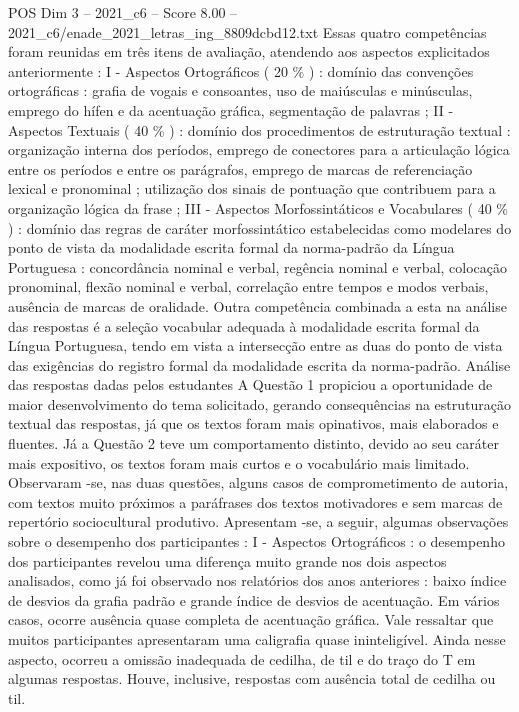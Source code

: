 \begin{textsample}{POS Dim 3 – 2021\_c6 – Score 8.00 – 2021\_c6/enade\_2021\_letras\_ing\_8809dcbd12.txt}
Essas quatro competências foram reunidas em três itens de avaliação, atendendo aos aspectos explicitados anteriormente : I - Aspectos Ortográficos ( 20 \% ) : domínio das convenções ortográficas : grafia de vogais e consoantes, uso de maiúsculas e minúsculas, emprego do hífen e da acentuação gráfica, segmentação de palavras ; II - Aspectos Textuais ( 40 \% ) : domínio dos procedimentos de estruturação textual : organização interna dos períodos, emprego de conectores para a articulação lógica entre os períodos e entre os parágrafos, emprego de marcas de referenciação lexical e pronominal ; utilização dos sinais de pontuação que contribuem para a organização lógica da frase ; III - Aspectos Morfossintáticos e Vocabulares ( 40 \% ) : domínio das regras de caráter morfossintático estabelecidas como modelares do ponto de vista da modalidade escrita formal da norma-padrão da Língua Portuguesa : concordância nominal e verbal, regência nominal e verbal, colocação pronominal, flexão nominal e verbal, correlação entre tempos e modos verbais, ausência de marcas de oralidade.
Outra competência combinada a esta na análise das respostas é a seleção vocabular adequada à modalidade escrita formal da Língua Portuguesa, tendo em vista a intersecção entre as duas do ponto de vista das exigências do registro formal da modalidade escrita da norma-padrão.
Análise das respostas dadas pelos estudantes A Questão 1 propiciou a oportunidade de maior desenvolvimento do tema solicitado, gerando consequências na estruturação textual das respostas, já que os textos foram mais opinativos, mais elaborados e fluentes.
Já a Questão 2 teve um comportamento distinto, devido ao seu caráter mais expositivo, os textos foram mais curtos e o vocabulário mais limitado.
Observaram -se, nas duas questões, alguns casos de comprometimento de autoria, com textos muito próximos a paráfrases dos textos motivadores e sem marcas de repertório sociocultural produtivo.
Apresentam -se, a seguir, algumas observações sobre o desempenho dos participantes : I - Aspectos Ortográficos : o desempenho dos participantes revelou uma diferença muito grande nos dois aspectos analisados, como já foi observado nos relatórios dos anos anteriores : baixo índice de desvios da grafia padrão e grande índice de desvios de acentuação.
Em vários casos, ocorre ausência quase completa de acentuação gráfica.
Vale ressaltar que muitos participantes apresentaram uma caligrafia quase ininteligível.
Ainda nesse aspecto, ocorreu a omissão inadequada de cedilha, de til e do traço do T em algumas respostas.
Houve, inclusive, respostas com ausência total de cedilha ou til.

\end{textsample}
